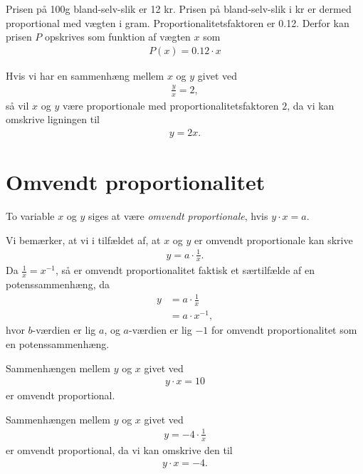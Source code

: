 \begin{exa}
	\label{exa:slik}
	Prisen på 100g bland-selv-slik er 12 kr. Prisen på bland-selv-slik i kr er dermed proportional med vægten i gram. Proportionalitetsfaktoren er 0.12. Derfor kan prisen $P$ opskrives som funktion af 		vægten $x$ som
 	\begin{align*}
 		P(x) = 0.12 \cdot x
 	\end{align*}
\end{exa}

\begin{exa}
	Hvis vi har en sammenhæng mellem $x$ og $y$ givet ved
	\begin{align*}
		\frac{y}{x} = 2,
	\end{align*}
	så vil $x$ og $y$ være proportionale med proportionalitetsfaktoren $2$, da vi kan omskrive ligningen til
	\begin{align*}
		y = 2x.
	\end{align*}
\end{exa}

\section*{Omvendt proportionalitet}

\begin{defn}
	To variable $x$ og $y$ siges at være \textit{omvendt proportionale}, hvis $y\cdot x = a$. 
\end{defn}
Vi bemærker, at vi i tilfældet af, at $x$ og $y$ er omvendt proportionale kan skrive
\begin{align*}
	y = a \cdot \frac{1}{x}.
\end{align*}
Da $\frac{1}{x} = x^{-1}$, så er omvendt proportionalitet faktisk et særtilfælde af en potenssammenhæng, da
\begin{align*}
	y &= a \cdot \frac{1}{x} \\
	&= a \cdot x^{-1},
\end{align*}
hvor $b$-værdien er lig $a$, og $a$-værdien er lig $-1$ for omvendt proportionalitet som en potenssammenhæng. 

\begin{exa}
	Sammenhængen mellem $y$ og $x$ givet ved
	\begin{align*}
		y\cdot x = 10
	\end{align*}
	er omvendt proportional.
\end{exa}

\begin{exa}
	Sammenhængen mellem $y$ og $x$ givet ved
	\begin{align*}
		y = -4 \cdot \frac{1}{x}
	\end{align*}
	er omvendt proportional, da vi kan omskrive den til
	\begin{align*}
		y\cdot x = -4.
	\end{align*}
\end{exa}





